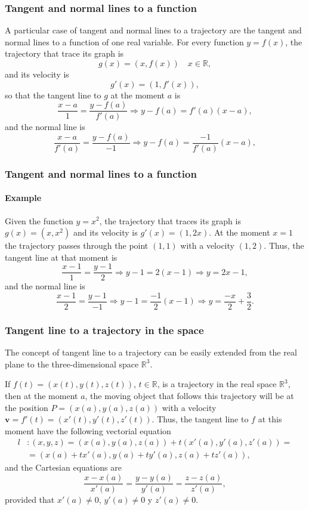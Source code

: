 \begin{frame}
\frametitle{Tangent and normal lines to a function}
A particular case of tangent and normal lines to a trajectory are the tangent and normal lines to a function of one real variable. 
For every function $y=f(x)$, the trajectory that trace its graph is
\[
g(x) = (x,f(x))  \quad x\in \mathbb{R},
\]
and its velocity is 
\[
g'(x) = (1,f'(x)),
\]
so that the tangent line to $g$ at the moment $a$ is
\[
\frac{x-a}{1} = \frac{y-f(a)}{f'(a)} \Rightarrow y-f(a) = f'(a)(x-a),
\]
and the normal line is 
\[
\frac{x-a}{f'(a)} = \frac{y-f(a)}{-1} \Rightarrow y-f(a) = \frac{-1}{f'(a)}(x-a),
\]
\end{frame}


\begin{frame}
\frametitle{Tangent and normal lines to a function}
\framesubtitle{Example}
Given the function $y=x^2$, the trajectory that traces its graph is $g(x)=(x,x^2)$ and its velocity is 
$g'(x)=(1,2x)$. At the moment $x=1$ the trajectory passes through the point $(1,1)$ with a velocity $(1,2)$.
Thus, the tangent line at that moment is 
\[
\frac{x-1}{1} = \frac{y-1}{2} \Rightarrow y-1 = 2(x-1) \Rightarrow y = 2x-1,
\]
and the normal line is 
\[
\frac{x-1}{2} = \frac{y-1}{-1} \Rightarrow y-1 = \frac{-1}{2}(x-1) \Rightarrow y = \frac{-x}{2}+\frac{3}{2}.
\]
\begin{center}

\end{center}
\end{frame}


\begin{frame}
\frametitle{Tangent line to a trajectory in the space}
The concept of tangent line to a trajectory can be easily extended from the real plane to the three-dimensional space $\mathbb{R}^3$.

If $f(t)=(x(t),y(t),z(t))$, $t\in \mathbb{R}$, is a trajectory in the real space $\mathbb{R}^3$, then at the moment $a$, the moving object that follows this trajectory will be at the position $P=(x(a),y(a),z(a))$ with a velocity $\mathbf{v}=f'(t)=(x'(t),y'(t),z'(t))$.
Thus, the tangent line to $f$ at this moment have the following vectorial equation
\begin{align*}
l&: (x,y,z)=(x(a),y(a),z(a))+t(x'(a),y'(a),z'(a)) =\\
&= (x(a)+tx'(a),y(a)+ty'(a),z(a)+tz'(a)),
\end{align*}
and the Cartesian equations are 
\[
\frac{x-x(a)}{x'(a)}=\frac{y-y(a)}{y'(a)}=\frac{z-z(a)}{z'(a)},
\]
provided that $x'(a)\neq 0$, $y'(a)\neq 0$ y $z'(a)\neq 0$.
\end{frame}


